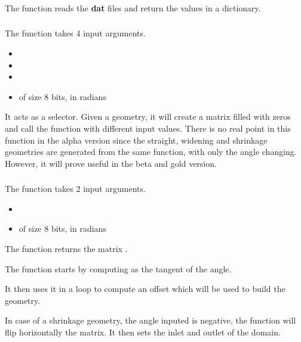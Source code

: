 \subsubsection{\textcolor{func}{}}
The function \textcolor{func}{} reads the \textbf{dat} files and return the
values in a dictionary.

\subsubsection{\textcolor{func}{}}
The function \textcolor{func}{} takes 4 input arguments.
\begin{itemize}
      \item {}
      \item {}
      \item {}
      \item {} of size 8 bits, in radians
\end{itemize}
It acts as a selector. Given a geometry, it will create a matrix  filled
with zeros and call the function \textcolor{func}{} with different input
values. There is no real point in this function in the alpha version since the
straight, widening and shrinkage geometries are generated from the same
function, with only the angle changing. However, it will prove useful in the
beta and gold version.

\subsubsection{\textcolor{func}{}}
The function \textcolor{func}{} takes 2 input arguments.
\begin{itemize}
      \item {} \textcolor{dtype}{}
      \item {} of size 8 bits, in radians
\end{itemize}
The function returns the matrix .

The function starts by computing  as the tangent of the angle.

It then uses it in a  loop to compute an offset which will be used to
build the geometry.

In case of a shrinkage geometry, the angle inputed is negative, the function
will flip horizontally the matrix. It then sets the inlet and outlet of the
domain.

